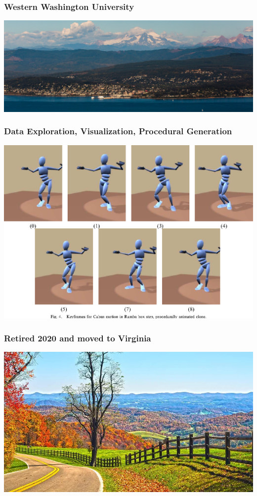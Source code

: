 \documentclass{beamer}
\begin{document}
\begin{frame}
\frametitle{Western Washington University}
\includegraphics[width=\textwidth]{wwu}
\end{frame}


\begin{frame}
\frametitle{Data Exploration, Visualization, Procedural Generation}
\includegraphics[width=\textwidth]{rumba}
\end{frame}


\begin{frame}
\frametitle{Retired 2020 and moved to Virginia}
\includegraphics[width=\textwidth]{virginia}
\end{frame}
\end{document}
